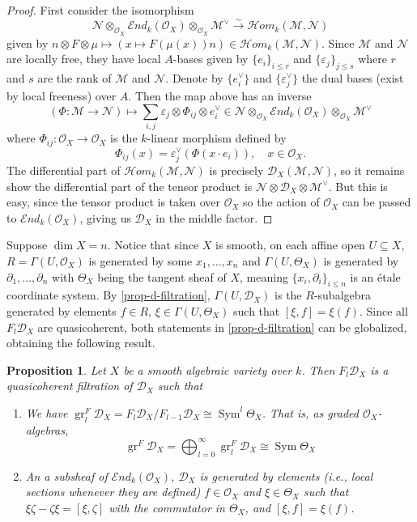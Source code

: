 \documentclass[11pt, a4paper]{article}
\newtheorem{proposition}[theorem]{Proposition}
\theoremstyle{definition}
\newcommand{\gr}{\operatorname{gr}}
\newcommand{\ve}[0]{\varepsilon}
\newcommand{\Sym}[0]{\operatorname{Sym}}
\begin{document}
    \begin{proof}
        First consider the isomorphism
        \[\mathcal N\otimes_{\mathcal O_X}\mathcal End_k(\mathcal O_X)\otimes_{\mathcal O_X}\mathcal M^\vee\xrightarrow{\sim}\mathcal Hom_k(\mathcal M,\mathcal N)\]
        given by $n\otimes F\otimes \mu\mapsto (x\mapsto F(\mu(x))n)\in \mathcal Hom_k(\mathcal M,\mathcal N)$. Since $\mathcal M$ and $\mathcal N$ are locally free, they have local $A$-bases given by $\{e_i\}_{i\leqslant r}$ and $\{\ve_j\}_{j\leqslant s}$ where $r$ and $s$ are the rank of $\mathcal M$ and $\mathcal N$. Denote by $\{e_i^\vee\}$ and $\{\ve_j^\vee\}$ the dual bases (exist by local freeness) over $A$. Then the map above has an inverse
        \[(\Phi:\mathcal M\to \mathcal N)\mapsto\sum_{i, j}\ve_j\otimes\Phi_{ij}\otimes e_i^\vee\in \mathcal N\otimes_{\mathcal O_X}\mathcal End_k(\mathcal O_X)\otimes_{\mathcal O_X}\mathcal M^\vee\]
        where $\Phi_{ij}:\mathcal O_X\to\mathcal O_X$ is the $k$-linear morphism defined by
        \[\Phi_{ij}(x)=\ve_j^\vee(\Phi(x\cdot e_i)),\quad x\in\mathcal O_X.\]
        The differential part of $\mathcal Hom_k(\mathcal M,\mathcal N)$ is precisely $\mathcal D_X(\mathcal M,\mathcal N)$, so it remains show the differential part of the tensor product is $\mathcal N\otimes\mathcal D_X\otimes \mathcal M^\vee$. But this is easy, since the tensor product is taken over $\mathcal O_X$ so the action of $\mathcal O_X$ can be passed to $\mathcal End_k(\mathcal O_X)$, giving us $\mathcal D_X$ in the middle factor.
    \end{proof}
    Suppose $\dim X=n$. Notice that since $X$ is smooth, on each affine open $U\subseteq X$, $R=\Gamma(U,\mathcal O_X)$ is generated by some $x_1,\dots, x_n$ and $\Gamma(U, \Theta_X)$ is generated by $\partial_1,\dots,\partial_n$ with $\Theta_X$ being the tangent sheaf of $X$, meaning $\{x_i,\partial_i\}_{i\leqslant n}$ is an étale coordinate system. By \cref{prop-d-filtration}, $\Gamma(U, \mathcal D_X)$ is the $R$-subalgebra generated by elements $f\in R$, $\xi\in\Gamma(U, \Theta_X)$ such that $[\xi, f]=\xi(f)$. Since all $F_l\mathcal D_X$ are quasicoherent, both statements in \cref{prop-d-filtration} can be globalized, obtaining the following result.
    \begin{proposition}\label{prop-dx-filtration}
        Let $X$ be a smooth algebraic variety over $k$. Then $F_l\mathcal D_X$ is a quasicoherent filtration of $\mathcal D_X$ such that
        \begin{enumerate}[\normalfont(i)]
            \item We have $\gr_l^F\mathcal D_X=F_l\mathcal D_X/F_{l-1}\mathcal D_X\cong\Sym^l\Theta_X$. That is, as graded $\mathcal O_X$-algebras,
            \[\gr^F\mathcal D_X=\bigoplus_{l=0}^\infty \gr_l^F\mathcal D_X\cong\Sym\Theta_X\]
            \item An a subsheaf of $\mathcal End_k(\mathcal O_X)$, $\mathcal D_X$ is generated by elements (i.e., local sections whenever they are defined) $f\in\mathcal O_X$ and $\xi\in\Theta_X$ such that $\xi\zeta-\zeta\xi=[\xi,\zeta]$ with the commutator in $\Theta_X$, and $[\xi, f]=\xi(f)$. 
        \end{enumerate}
    \end{proposition}
\end{document}
